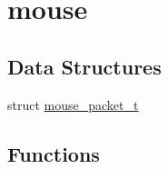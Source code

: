 \hypertarget{group__mouse}{}\section{mouse}
\label{group__mouse}
\subsection*{Data Structures}
\begin{DoxyCompactItemize}
\item 
struct \hyperlink{structmouse__packet__t}{mouse\+\_\+packet\+\_\+t}
\end{DoxyCompactItemize}
\subsection*{Functions}

